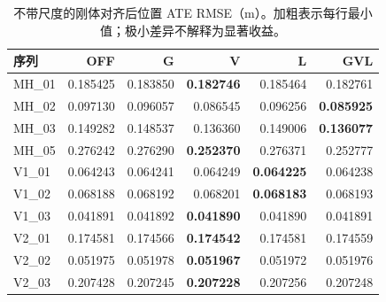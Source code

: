 \begin{table}[tb]
\caption{不带尺度的刚体对齐后位置 ATE RMSE（m）。加粗表示每行最小值；极小差异不解释为显著收益。}\label{tab:ate}
\centering\small
\begin{tabular}{lrrrrr}
\toprule
序列 & OFF & G & V & L & GVL \\
\midrule
MH\_01 & 0.185425 & 0.183850 & \textbf{0.182746} & 0.185464 & 0.182761 \\
MH\_02 & 0.097130 & 0.096057 & 0.086545 & 0.096256 & \textbf{0.085925} \\
MH\_03 & 0.149282 & 0.148537 & 0.136360 & 0.149006 & \textbf{0.136077} \\
MH\_05 & 0.276242 & 0.276290 & \textbf{0.252370} & 0.276371 & 0.252777 \\
V1\_01 & 0.064243 & 0.064241 & 0.064249 & \textbf{0.064225} & 0.064238 \\
V1\_02 & 0.068188 & 0.068192 & 0.068201 & \textbf{0.068183} & 0.068193 \\
V1\_03 & 0.041891 & 0.041892 & \textbf{0.041890} & 0.041890 & 0.041891 \\
V2\_01 & 0.174581 & 0.174566 & \textbf{0.174542} & 0.174581 & 0.174559 \\
V2\_02 & 0.051975 & 0.051978 & \textbf{0.051967} & 0.051972 & 0.051976 \\
V2\_03 & 0.207428 & 0.207245 & \textbf{0.207228} & 0.207256 & 0.207248 \\
\bottomrule
\end{tabular}
\end{table}
